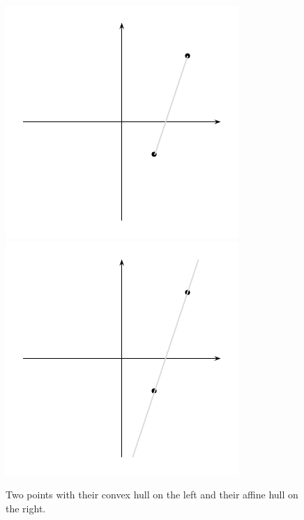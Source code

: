 \begin{figure}[htbp]
  \begin{center}{
      \includegraphics{figures/picture2-1.pdf} 
      \hfill
      \includegraphics{figures/picture2-2.pdf} 
    }
    
  \end{center}
  \caption{Two points with their convex hull on the left and  their
    affine hull on the right. }\label{conv:fig:1}
\end{figure}





